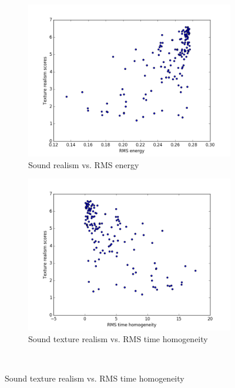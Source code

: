 \documentclass{sig-alternate-05-2015}
\begin{document}
    \begin{figure}[hbt!]
    \centering
    \begin{subfigure}[b]{0.45\textwidth}
      \centering
      \includegraphics[width=\textwidth]{figures/rms_energy.png}
      \caption{Sound realism vs. RMS energy}
      \label{fig:rmsenergy}
    \end{subfigure}
    \hfill 
    \begin{subfigure}[b]{0.45\textwidth}
      \centering
      \includegraphics[width=\textwidth]{figures/rms_time_homogeneity.png}
      \caption{Sound texture realism vs. RMS time homogeneity}
      \label{fig:rmshomog}
    \end{subfigure}
    \\

\end{figure}
\end{document}
